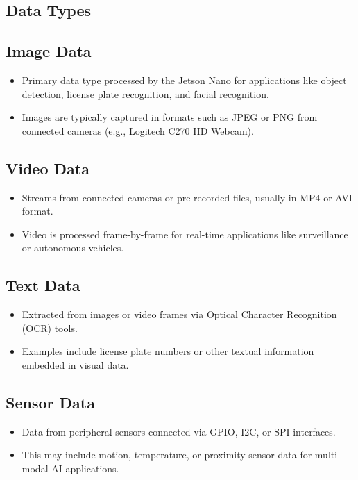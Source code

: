 \subsection{Data Types}

\subsection*{Image Data}
\begin{itemize}[leftmargin=1.5cm]
	\item Primary data type processed by the Jetson Nano for applications like object detection, license plate recognition, and facial recognition.
	\item Images are typically captured in formats such as JPEG or PNG from connected cameras (e.g., Logitech C270 HD Webcam).
\end{itemize}

\subsection*{Video Data}
\begin{itemize}[leftmargin=1.5cm]
	\item Streams from connected cameras or pre-recorded files, usually in MP4 or AVI format.
	\item Video is processed frame-by-frame for real-time applications like surveillance or autonomous vehicles.
\end{itemize}

\subsection*{Text Data}
\begin{itemize}[leftmargin=1.5cm]
	\item Extracted from images or video frames via Optical Character Recognition (OCR) tools.
	\item Examples include license plate numbers or other textual information embedded in visual data.
\end{itemize}

\subsection*{Sensor Data}
\begin{itemize}[leftmargin=1.5cm]
	\item Data from peripheral sensors connected via GPIO, I2C, or SPI interfaces.
	\item This may include motion, temperature, or proximity sensor data for multi-modal AI applications.
\end{itemize}

